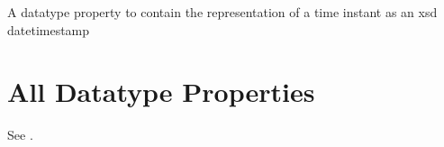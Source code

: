 \documentclass[letterpaper,10pt,english]{sphinxmanual}
\begin{document}
\begin{sphinxShadowBox}

\sphinxAtStartPar
A datatype property to contain the representation of a time instant as an xsd datetimestamp
\end{sphinxShadowBox}

\begin{sphinxShadowBox}

\sphinxAtStartPar
{}
\end{sphinxShadowBox}


\section{All Datatype Properties}
\label{\detokenize{datatype-properties:all-datatype-properties}}
\sphinxAtStartPar
See {\hyperref[\detokenize{datatype-properties:table-8}]{}}.
\end{document}
